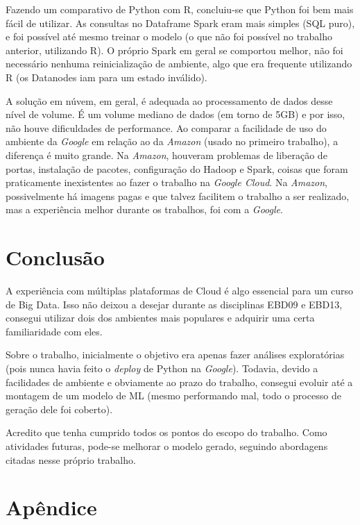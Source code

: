 \documentclass{article}
\begin{document}
Fazendo um comparativo de Python com R, concluiu-se que Python foi bem mais fácil de utilizar. As consultas no Dataframe Spark eram mais simples (SQL puro), e foi possível até mesmo treinar o modelo (o que não foi possível no trabalho anterior, utilizando R). O próprio Spark em geral se comportou melhor, não foi necessário nenhuma reinicialização de ambiente, algo que era frequente utilizando R (os Datanodes iam para um estado inválido).

A solução em núvem, em geral, é adequada ao processamento de dados desse nível de volume. É um volume mediano de dados (em torno de 5GB) e por isso, não houve dificuldades de performance. Ao comparar a facilidade de uso do ambiente da \emph{Google} em relação ao da \emph{Amazon} (usado no primeiro trabalho), a diferença é muito grande. Na \emph{Amazon}, houveram problemas de liberação de portas, instalação de pacotes, configuração do Hadoop e Spark, coisas que foram praticamente inexistentes ao fazer o trabalho na \emph{Google Cloud}. Na \emph{Amazon}, possivelmente há imagens pagas e que talvez facilitem o trabalho a ser realizado, mas a experiência melhor durante os trabalhos, foi com a \emph{Google}.

\newpage
\section{Conclusão}
\label{sect:end}

A experiência com múltiplas plataformas de Cloud é algo essencial para um curso de Big Data. Isso não deixou a desejar durante as disciplinas EBD09 e EBD13, consegui utilizar dois dos ambientes mais populares e adquirir uma certa familiaridade com eles. 

Sobre o trabalho, inicialmente o objetivo era apenas fazer análises exploratórias (pois nunca havia feito o \emph{deploy} de Python na \emph{Google}). Todavia, devido a facilidades de ambiente e obviamente ao prazo do trabalho, consegui evoluir até a montagem de um modelo de ML (mesmo performando mal, todo o processo de geração dele foi coberto).

Acredito que tenha cumprido todos os pontos do escopo do trabalho. Como atividades futuras, pode-se melhorar o modelo gerado, seguindo abordagens citadas nesse próprio trabalho.


\newpage
\section*{Apêndice}
\label{sect:eval_data}
\end{document}
